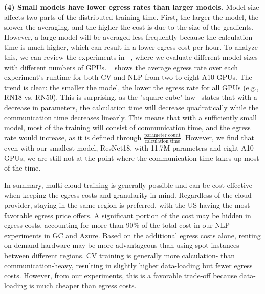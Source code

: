 \textbf{(4) Small models have lower egress rates than larger models.} Model size affects two parts of the distributed training time.
First, the larger the model, the slower the averaging, and the higher the cost is due to the size of the gradients.
However, a large model will be averaged less frequently because the calculation time is much higher, which can result in a lower egress cost per hour.
To analyze this, we can review the experiments in ~, where we evaluate different model sizes with different numbers of GPUs.
~ shows the average egress rate over each experiment's runtime for both CV and NLP from two to eight A10 GPUs.
The trend is clear: the smaller the model, the lower the egress rate for all GPUs (e.g., RN18 vs. RN50).
This is surprising, as the "square-cube" law~\cite{ryabinin2023swarm} states that with a decrease in parameters, the calculation time will decrease quadratically while the communication time decreases linearly.
This means that with a sufficiently small model, most of the training will consist of communication time, and the egress rate would increase, as it is defined through $\frac{\text{parameter count}}{\text{calculation time}}$.
However, we find that even with our smallest model, ResNet18, with 11.7M parameters and eight A10 GPUs, we are still not at the point where the communication time takes up most of the time.

In summary, multi-cloud training is generally possible and can be cost-effective when keeping the egress costs and granularity in mind.
Regardless of the cloud provider, staying in the same region is preferred, with the US having the most favorable egress price offers.
A significant portion of the cost may be hidden in egress costs, accounting for more than 90\% of the total cost in our NLP experiments in GC and Azure.
Based on the additional egress costs alone, renting on-demand hardware may be more advantageous than using spot instances between different regions.
CV training is generally more calculation- than communication-heavy, resulting in slightly higher data-loading but fewer egress costs.
However, from our experiments, this is a favorable trade-off because data-loading is much cheaper than egress costs.